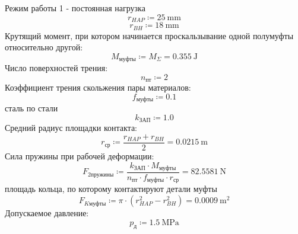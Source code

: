 \documentclass{article}
\newcommand{\defeq}{\coloneq} %
\begin{document}
\colorbox[HTML]{000000}{Режим работы 1 - постоянная нагрузка}\newline
\begin{equation*}
r_{HAP} \defeq 25 \: \mathrm{mm}
\end{equation*}
\begin{equation*}
r_{BH} \defeq 18 \: \mathrm{mm}
\end{equation*}
\colorbox[HTML]{000000}{Крутящий момент, при котором начинается проскальзывание одной полумуфты относительно другой:}\newline
\begin{equation*}
M_{муфты} \defeq M_{Σ} = {0.355 \: \mathrm{J}}
\end{equation*}
\colorbox[HTML]{000000}{Число поверхностей трения:}\newline
\begin{equation*}
n_{пт} \defeq 2
\end{equation*}
\colorbox[HTML]{000000}{Коэффициент трения скольжения пары материалов:}\newline
\begin{equation*}
f_{муфты} \defeq 0.1
\end{equation*}
\colorbox[HTML]{000000}{сталь по стали}\newline
\begin{equation*}
k_{ЗАП} \defeq 1.0
\end{equation*}
\colorbox[HTML]{000000}{Средний радиус площадки контакта:}\newline
\begin{equation*}
r_{ср} \defeq \frac{r_{HAP}+r_{BH}}{2} = {0.0215 \: \mathrm{m}}
\end{equation*}
\colorbox[HTML]{000000}{Сила пружины при рабочей деформации:}\newline
\begin{equation*}
\textit{F}_{\textit{2пружины}} \defeq \frac{k_{ЗАП} \cdot M_{муфты}}{n_{пт} \cdot f_{муфты} \cdot r_{ср}} = {82.5581 \: \mathrm{N}}
\end{equation*}
\colorbox[HTML]{000000}{площадь кольца, по которому контактируют детали муфты}\newline
\begin{equation*}
F_{Kмуфты} \defeq {\pi} \cdot \left( r_{HAP}^{2}-r_{BH}^{2} \right) = {0.0009 \: \mathrm{m}^{2}}
\end{equation*}
\colorbox[HTML]{000000}{Допускаемое давление:}\newline
\begin{equation*}
p_{д} \defeq 1.5 \: \mathrm{MPa}
\end{equation*}
\end{document}
